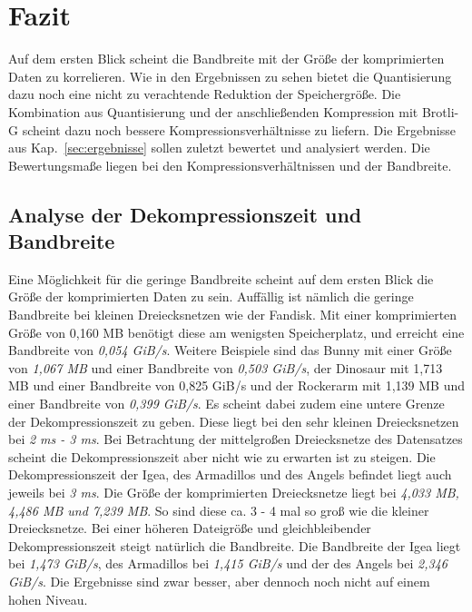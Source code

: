 \section{Fazit}
\label{sec:fazit}
Auf dem ersten Blick scheint die Bandbreite mit der Größe der komprimierten Daten zu korrelieren.
Wie in den Ergebnissen zu sehen bietet die Quantisierung dazu noch eine nicht zu verachtende Reduktion der Speichergröße.
Die Kombination aus Quantisierung und der anschließenden Kompression mit Brotli-G scheint dazu noch bessere Kompressionsverhältnisse zu liefern. \newline
Die Ergebnisse aus Kap.~\ref{sec:ergebnisse} sollen zuletzt bewertet und analysiert werden.
Die Bewertungsmaße liegen bei den Kompressionsverhältnissen und der Bandbreite.

\subsection{Analyse der Dekompressionszeit und Bandbreite}
\label{subsec:ana_bandwidth}
Eine Möglichkeit für die geringe Bandbreite scheint auf dem ersten Blick die Größe der komprimierten Daten zu sein.
Auffällig ist nämlich die geringe Bandbreite bei kleinen Dreiecksnetzen wie der Fandisk.
Mit einer komprimierten Größe von 0,160 MB benötigt diese am wenigsten Speicherplatz, und erreicht eine Bandbreite von \textit{0,054 GiB/s}.
Weitere Beispiele sind das Bunny mit einer Größe von \textit{1,067 MB} und einer Bandbreite von \textit{0,503 GiB/s}, der Dinosaur mit 1,713 MB und einer Bandbreite von 0,825 GiB/s und der Rockerarm mit 1,139 MB und einer Bandbreite von \textit{0,399 GiB/s}.
Es scheint dabei zudem eine untere Grenze der Dekompressionszeit zu geben.
Diese liegt bei den sehr kleinen Dreiecksnetzen bei \textit{2 ms - 3 ms}.
Bei Betrachtung der mittelgroßen Dreiecksnetze des Datensatzes scheint die Dekompressionszeit aber nicht wie zu erwarten ist zu steigen.
Die Dekompressionszeit der Igea, des Armadillos und des Angels befindet liegt auch jeweils bei \textit{3 ms}.
Die Größe der komprimierten Dreiecksnetze liegt bei \textit{4,033 MB, 4,486 MB und 7,239 MB}.
So sind diese ca. 3 - 4 mal so groß wie die kleiner Dreiecksnetze. 
Bei einer höheren Dateigröße und gleichbleibender Dekompressionszeit steigt natürlich die Bandbreite. 
Die Bandbreite der Igea liegt bei \textit{1,473 GiB/s}, des Armadillos bei \textit{1,415 GiB/s} und der des Angels bei \textit{2,346 GiB/s}.
Die Ergebnisse sind zwar besser, aber dennoch noch nicht auf einem hohen Niveau. \newline

